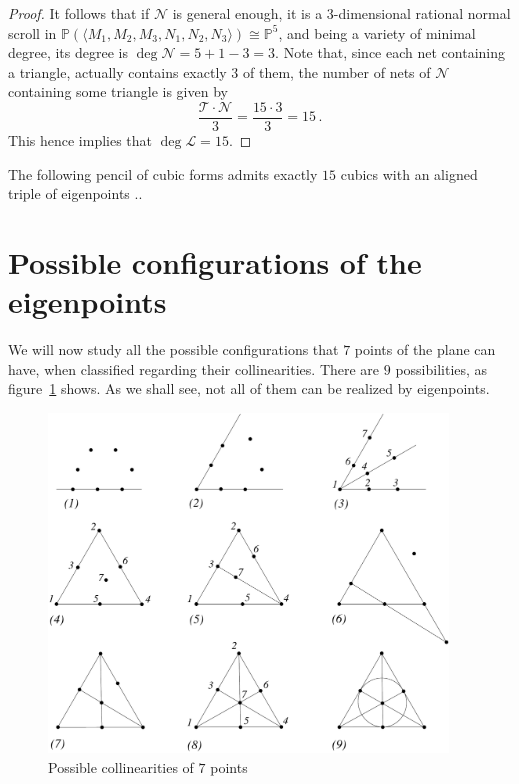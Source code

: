 \documentclass{amsart}
\theoremstyle{plain}
\theoremstyle{definition}
\newcommand{\p}{\mathbb{P}}
\begin{document}
\begin{proof}
{It follows that if ${\mathcal N}$ is general enough, it is a $3$-dimensional rational normal scroll in $\p(\langle M_1,M_2,M_3,N_1,N_2,N_3
\rangle) \cong \p^5$, and being a variety of minimal degree, its degree is $\deg {\mathcal N}=5+1-3=3$.
}
Note that, since each net containing a triangle, actually contains exactly $3$ of them, the number of nets of ${\mathcal N}$ containing some triangle is given by
%
\[
\frac {{\mathcal T} \cdot {\mathcal N}}{3} =\frac{{15} \cdot {3}}{3}=15 \,.
\]
%
This hence implies that $\deg {\mathcal L} = 15$.
\end{proof}


The following pencil of cubic forms admits exactly $15$ cubics with an aligned triple of eigenpoints ..









\section{Possible configurations of the eigenpoints}

We will now study all the possible configurations that $7$ points of the
plane can have, when classified regarding their collinearities. There are
$9$ possibilities, as figure~\ref{collin} shows. As we shall see,
not all of them can be realized by eigenpoints. 

\begin{figure}
\includegraphics[height=9cm]{noveConfB.pdf}
\caption{Possible collinearities of $7$ points
\label{collin}}
\end{figure}
\end{document}
